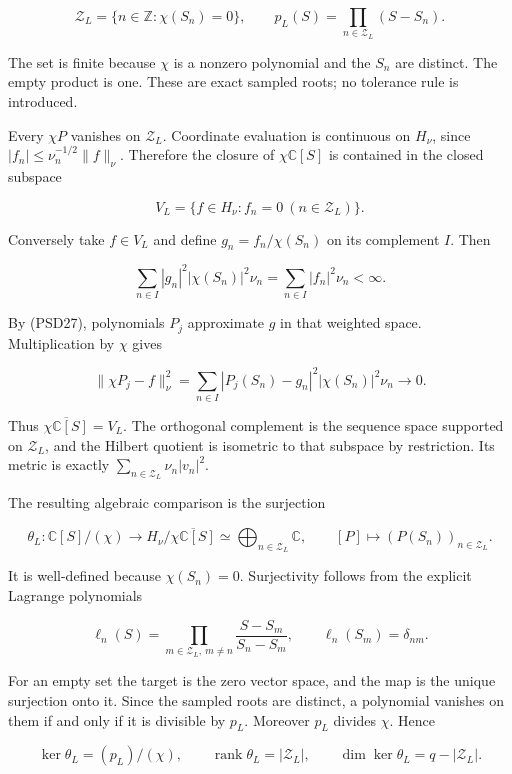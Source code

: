 \[
\mathcal Z_L=\{n\in\mathbb Z:\chi(S_n)=0\},\qquad
p_L(S)=\prod_{n\in\mathcal Z_L}(S-S_n).
\tag{PSD28}
\]

The set is finite because \(\chi\) is a nonzero polynomial and the \(S_n\) are distinct. The empty product is one. These are exact sampled roots; no tolerance rule is introduced.

Every \(\chi P\) vanishes on \(\mathcal Z_L\). Coordinate evaluation is continuous on \(H_\nu\), since \(|f_n|\le\nu_n^{-1/2}\|f\|_\nu\). Therefore the closure of \(\chi \mathbb C[S]\) is contained in the closed subspace

\[
V_L=\{f\in H_\nu:f_n=0\ (n\in\mathcal Z_L)\}.
\]

Conversely take \(f \in V_L\) and define \(g_n=f_n/\chi(S_n)\) on its complement \(I\). Then

\[
\sum_{n\in I}|g_n|^2|\chi(S_n)|^2\nu_n
=\sum_{n\in I}|f_n|^2\nu_n<\infty.
\]

By (PSD27), polynomials \(P_j\) approximate \(g\) in that weighted space. Multiplication by \(\chi\) gives

\[
\|\chi P_j-f\|_\nu^2
=\sum_{n\in I}|P_j(S_n)-g_n|^2|\chi(S_n)|^2\nu_n\longrightarrow0.
\tag{PSD29}
\]

Thus \(\overline{\chi\mathbb C[S]}=V_L\). The orthogonal complement is the sequence space supported on \(\mathcal Z_L\), and the Hilbert quotient is isometric to that subspace by restriction. Its metric is exactly \(\sum_{n\in\mathcal Z_L}\nu_n|v_n|^2\).

The resulting algebraic comparison is the surjection

\[
\theta_L:\mathbb C[S]/(\chi)\longrightarrow
H_\nu/\overline{\chi\mathbb C[S]}
\simeq\bigoplus_{n\in\mathcal Z_L}\mathbb C,
\qquad [P]\longmapsto(P(S_n))_{n\in\mathcal Z_L}.
\tag{PSD30}
\]

It is well-defined because \(\chi(S_n)=0\). Surjectivity follows from the explicit Lagrange polynomials

\[
\ell_n(S)=\prod_{m\in\mathcal Z_L,\ m\ne n}\frac{S-S_m}{S_n-S_m},
\qquad \ell_n(S_m)=\delta_{nm}.
\tag{PSD31}
\]

For an empty set the target is the zero vector space, and the map is the unique surjection onto it. Since the sampled roots are distinct, a polynomial vanishes on them if and only if it is divisible by \(p_L\). Moreover \(p_L\) divides \(\chi\). Hence

\[
\ker\theta_L=(p_L)/(\chi),\qquad
\operatorname{rank}\theta_L=|\mathcal Z_L|,\qquad
\dim\ker\theta_L=q-|\mathcal Z_L|.
\tag{PSD32}
\]


